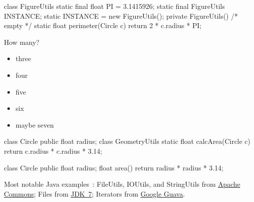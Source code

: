 \documentclass{article}
\begin{document}

\pptToc


\begin{pptWide}{2}
{\small\begin{ffcode}
class FigureUtils {
  static final float PI = 3.1415926;
  static final FigureUtils INSTANCE;
  static {
    INSTANCE = new FigureUtils();
  }
  private FigureUtils() { /* empty */ }
  static float perimeter(Circle c) {
    return 2 * c.radius * PI;
  }
}
\end{ffcode}
}
\par\columnbreak\par
How many?
\begin{itemize}
\item three
\item four
\item five
\item six
\item maybe seven
\end{itemize}
\end{pptWide}
\plush{}


\begin{pptWide}{2}
{\small\begin{ffcode}
class Circle {
  public float radius;
}
class GeometryUtils {
  static float calcArea(Circle c) {
    return c.radius * c.radius * 3.14;
  }
}
\end{ffcode}
}
\par\columnbreak\par
{\small\begin{ffcode}
class Circle {
  public float radius;
  float area() {
    return radius * radius * 3.14;
  }
}
\end{ffcode}
}
\end{pptWide}
\par
Most notable Java examples~\citep{bugayenko2015blog0220}:
FileUtils, IOUtils, and StringUtils from
\href{https://commons.apache.org/}{Apache Commons};
Files from \href{https://openjdk.org/projects/jdk7/}{JDK~7};
Iterators from \href{https://github.com/google/guava}{Google Guava}.
\plush{}

\end{document}
